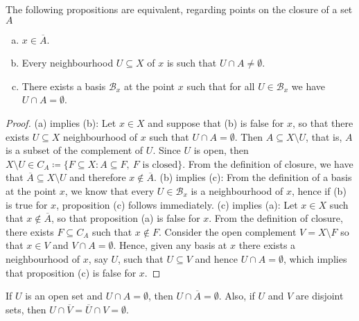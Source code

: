 \begin{proposition}\label{prop: closure equivalent prop}
The following propositions are equivalent, regarding points on the closure of a
set \(A\)
\begin{enumerate}[(a)]\setlength\itemsep{0em}
\item \(x \in \overline A\).

\item Every neighbourhood \(U \subseteq X\) of \(x\) is such that \(U
  \cap A \neq \emptyset\).

\item There exists a basis \(\mathcal B_x\) at the point \(x\) such that for all
  \(U \in \mathcal B_x\) we have \(U \cap A = \emptyset\).
\end{enumerate}
\end{proposition}

\begin{proof}
(a) implies (b): Let \(x \in X\) and suppose that (b) is false for \(x\), so
that there exists \(U \subseteq X\) neighbourhood of \(x\) such that \(U \cap A
= \emptyset\). Then \(A \subseteq X \setminus U\), that is, \(A\) is a subset of
the complement of \(U\). Since \(U\) is open, then \(X \setminus U \in C_A
\coloneq \{F \subseteq X \colon A \subseteq F,\ F \text{ is closed}\}\). From the
definition of closure, we have that \(\overline A \subseteq X \setminus U\) and
therefore \(x \not\in \overline A\). (b) implies (c): From the definition of a
basis at the point \(x\), we know that every \(U \in \mathcal B_x\) is a
neighbourhood of \(x\), hence if (b) is true for \(x\), proposition (c) follows
immediately. (c) implies (a): Let \(x \in X\) such that \(x \not\in \overline
A\), so that proposition (a) is false for \(x\).  From the definition of
closure, there exists \(F \subseteq C_A\) such that \(x \not\in F\). Consider
the open complement \(V = X \setminus F\) so that \(x \in V\) and \(V \cap A =
\emptyset\). Hence, given any basis at \(x\) there exists a neighbourhood of
\(x\), say \(U\), such that \(U \subseteq V\) and hence \(U \cap A =
\emptyset\), which implies that proposition (c) is false for \(x\).
\end{proof}

\begin{corollary}\label{cor: disjoint closure persistence}
If \(U\) is an open set and \(U \cap A = \emptyset\), then \(U \cap \overline
A = \emptyset\). Also, if \(U\) and \(V\) are disjoint sets, then \(U \cap
\overline V = \overline U \cap V = \emptyset\).
\end{corollary}

